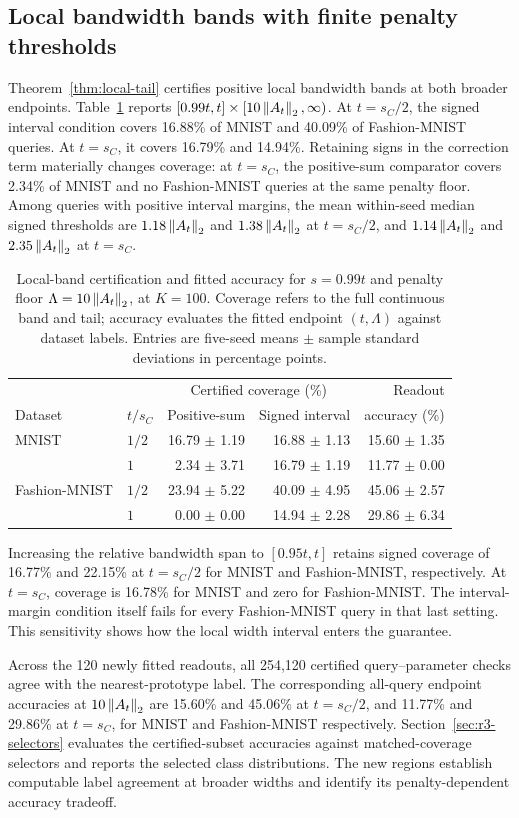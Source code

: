 \subsection{Local bandwidth bands with finite penalty thresholds}
\label{sec:tail-results}
Theorem~\ref{thm:local-tail} certifies positive local bandwidth bands at both broader endpoints. Table~\ref{tab:local-tail} reports $[0.99t,t]\times[10\left\lVert A_t\right\rVert_2,\infty)$. At $t=s_C/2$, the signed interval condition covers 16.88\% of MNIST and 40.09\% of Fashion-MNIST queries. At $t=s_C$, it covers 16.79\% and 14.94\%. Retaining signs in the correction term materially changes coverage: at $t=s_C$, the positive-sum comparator covers 2.34\% of MNIST and no Fashion-MNIST queries at the same penalty floor. Among queries with positive interval margins, the mean within-seed median signed thresholds are $1.18\left\lVert A_t\right\rVert_2$ and $1.38\left\lVert A_t\right\rVert_2$ at $t=s_C/2$, and $1.14\left\lVert A_t\right\rVert_2$ and $2.35\left\lVert A_t\right\rVert_2$ at $t=s_C$.

\begin{table}[!htbp]
\centering\small
\caption{Local-band certification and fitted accuracy for $s=0.99t$ and penalty floor $\Lambda=10\left\lVert A_t\right\rVert_2$, at $K=100$. Coverage refers to the full continuous band and tail; accuracy evaluates the fitted endpoint $(t,\Lambda)$ against dataset labels. Entries are five-seed means $\pm$ sample standard deviations in percentage points.}
\label{tab:local-tail}
\begin{tabular}{llrrr}
\toprule
 & & \multicolumn{2}{c}{Certified coverage (\%)} & Readout\\
Dataset & $t/s_C$ & Positive-sum & Signed interval & accuracy (\%)\\
\midrule
MNIST & $1/2$ & 16.79 $\pm$ 1.19 & 16.88 $\pm$ 1.13 & 15.60 $\pm$ 1.35 \\
 & $1$ & 2.34 $\pm$ 3.71 & 16.79 $\pm$ 1.19 & 11.77 $\pm$ 0.00 \\
\midrule
Fashion-MNIST & $1/2$ & 23.94 $\pm$ 5.22 & 40.09 $\pm$ 4.95 & 45.06 $\pm$ 2.57 \\
 & $1$ & 0.00 $\pm$ 0.00 & 14.94 $\pm$ 2.28 & 29.86 $\pm$ 6.34 \\
\bottomrule
\end{tabular}
\end{table}

Increasing the relative bandwidth span to $[0.95t,t]$ retains signed coverage of 16.77\% and 22.15\% at $t=s_C/2$ for MNIST and Fashion-MNIST, respectively. At $t=s_C$, coverage is 16.78\% for MNIST and zero for Fashion-MNIST. The interval-margin condition itself fails for every Fashion-MNIST query in that last setting. This sensitivity shows how the local width interval enters the guarantee.

Across the 120 newly fitted readouts, all 254,120 certified query--parameter checks agree with the nearest-prototype label. The corresponding all-query endpoint accuracies at $10\left\lVert A_t\right\rVert_2$ are 15.60\% and 45.06\% at $t=s_C/2$, and 11.77\% and 29.86\% at $t=s_C$, for MNIST and Fashion-MNIST respectively. Section~\ref{sec:r3-selectors} evaluates the certified-subset accuracies against matched-coverage selectors and reports the selected class distributions. The new regions establish computable label agreement at broader widths and identify its penalty-dependent accuracy tradeoff.

